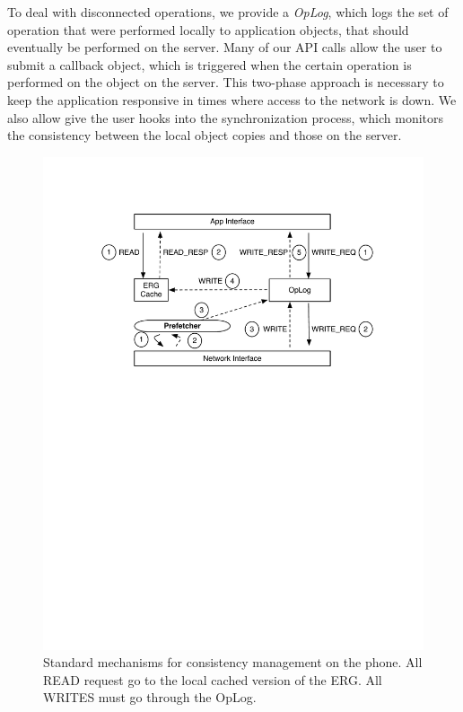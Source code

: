 To deal with disconnected operations, we provide a \emph{OpLog}, which logs the set of operation that were performed locally to
application objects, that should eventually be performed on the server.  Many of our API calls allow the user to submit a callback
object, which is triggered when the certain operation is performed on the object on the server.  This two-phase approach is necessary to keep
the application responsive in times where access to the network is down.  We also allow give the user hooks into the synchronization
process, which monitors the consistency between the local object copies and those on the server.


\begin{figure}[htb!]
\begin{center}
\includegraphics[scale=0.50]{figs/standard_interaction}
\caption{Standard mechanisms for consistency management on the phone.  All READ request go to the local
cached version of the ERG.  All WRITES must go through the OpLog.}
\label{fig:basic_arch}
\end{center}
\end{figure}

